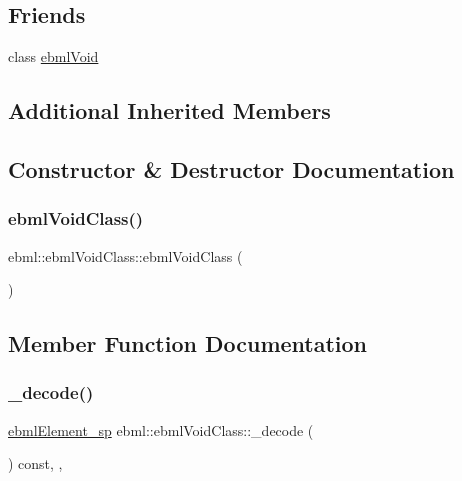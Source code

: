 \subsection*{Friends}
\begin{DoxyCompactItemize}
\item 
class \mbox{\hyperlink{classebml_1_1ebmlVoidClass_af2d556fe3de73937062cdd59bad2a1c0}{ebml\+Void}}
\end{DoxyCompactItemize}
\subsection*{Additional Inherited Members}


\subsection{Constructor \& Destructor Documentation}
\mbox{\label{classebml_1_1ebmlVoidClass_afc8666d6bbcd41bad76bfc5a2b5b4c9a}} 
\subsubsection{\texorpdfstring{ebml\+Void\+Class()}{ebmlVoidClass()}}
{\footnotesize\ttfamily ebml\+::ebml\+Void\+Class\+::ebml\+Void\+Class (\begin{DoxyParamCaption}{ }\end{DoxyParamCaption})}



\subsection{Member Function Documentation}
\mbox{\label{classebml_1_1ebmlVoidClass_ab12dc43d26e82dee3c66d69219e4d78d}} 
\subsubsection{\texorpdfstring{\+\_\+decode()}{\_decode()}\hspace{0.1cm}{\footnotesize\ttfamily [1/2]}}
{\footnotesize\ttfamily \mbox{\hyperlink{namespaceebml_adad533b7705a16bb360fe56380c5e7be}{ebml\+Element\+\_\+sp}} ebml\+::ebml\+Void\+Class\+::\+\_\+decode (\begin{DoxyParamCaption}\item[{const \mbox{\hyperlink{classebml_1_1parseString}{parse\+String}} \&}]{ }\end{DoxyParamCaption}) const\hspace{0.3cm}{\ttfamily [override]}, {\ttfamily [protected]}, {\ttfamily [virtual]}}



